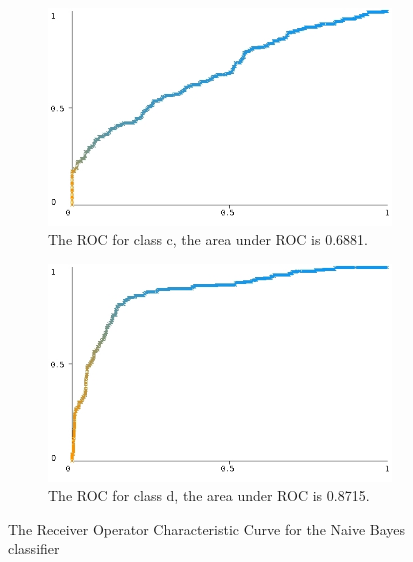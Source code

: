 \documentclass[10pt]{article}
\begin{document}
\begin{figure}[h]
\begin{subfigure}[b]{0.475\textwidth}
        \includegraphics[width=\textwidth]{bayes_roc/roc_curve_c.jpg}
        \caption[]%
        {{\small The ROC for class c, the area under ROC is 0.6881.}}    
        \label{fig:bayes roc curve class c}
    \end{subfigure}
    \quad
    \begin{subfigure}[b]{0.475\textwidth}   
        \centering 
        \includegraphics[width=\textwidth]{bayes_roc/roc_curve_e(d).jpg}
        \caption[]%
        {{\small The ROC for class d, the area under ROC is 0.8715.}}    
        \label{fig:bayes roc curve class d}
    \end{subfigure}
    \caption[ ]
    {\small The Receiver Operator Characteristic Curve for the Naive Bayes classifier} 
    \label{fig:naive bayes roc curves}
\end{figure}
\end{document}
